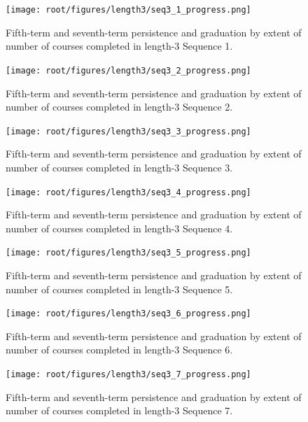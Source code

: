 \begin{figure}[!htbp]
\centering
\texttt{[image: root/figures/length3/seq3\_1\_progress.png]}
\caption{Fifth-term and seventh-term persistence and graduation by extent of number of courses completed in length-3 Sequence 1.}
\label{seq3_1}
\end{figure}

\begin{figure}[!htbp]
\centering
\texttt{[image: root/figures/length3/seq3\_2\_progress.png]}
\caption{Fifth-term and seventh-term persistence and graduation by extent of number of courses completed in length-3 Sequence 2.}
\label{seq3_2}
\end{figure}

\begin{figure}[!htbp]
\centering
\texttt{[image: root/figures/length3/seq3\_3\_progress.png]}
\caption{Fifth-term and seventh-term persistence and graduation by extent of number of courses completed in length-3 Sequence 3.}
\label{seq3_3}
\end{figure}

\begin{figure}[!htbp]
\centering
\texttt{[image: root/figures/length3/seq3\_4\_progress.png]}
\caption{Fifth-term and seventh-term persistence and graduation by extent of number of courses completed in length-3 Sequence 4.}
\label{seq3_4}
\end{figure}

\begin{figure}[!htbp]
\centering
\texttt{[image: root/figures/length3/seq3\_5\_progress.png]}
\caption{Fifth-term and seventh-term persistence and graduation by extent of number of courses completed in length-3 Sequence 5.}
\label{seq3_5}
\end{figure}

\begin{figure}[!htbp]
\centering
\texttt{[image: root/figures/length3/seq3\_6\_progress.png]}
\caption{Fifth-term and seventh-term persistence and graduation by extent of number of courses completed in length-3 Sequence 6.}
\label{seq3_6}
\end{figure}

\begin{figure}[!htbp]
\centering
\texttt{[image: root/figures/length3/seq3\_7\_progress.png]}
\caption{Fifth-term and seventh-term persistence and graduation by extent of number of courses completed in length-3 Sequence 7.}
\label{seq3_7}
\end{figure}

